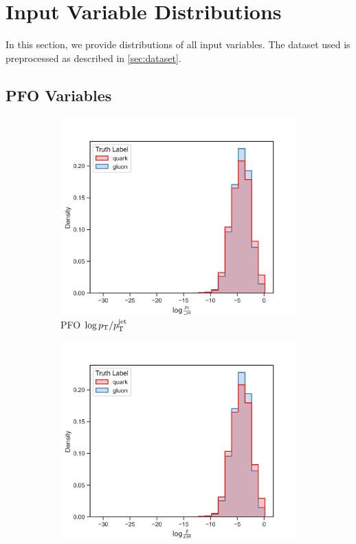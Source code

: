 \chapter{Input Variable Distributions}
\label{ch:app_input_variables}
In this section, we provide distributions of all input variables.
The dataset used is preprocessed as described in \cref{sec:dataset}.

\section{PFO Variables}
\label{sec:app_pfo_variables}
\begin{figure}[!htb]
    \begin{subfigure}[t]{0.45\textwidth}
        \includegraphics[width=\linewidth]{src/plots/distributions/PFOs/log_PT|PTjet.png}
        \caption{PFO $\log p_\text{T} / p_\text{T}^{\mathrm{jet}}$}
        \label{fig:app_pfo_log_pT_over_pT_jet}
    \end{subfigure}
    \begin{subfigure}[t]{0.45\textwidth}
        \includegraphics[width=\linewidth]{src/plots/distributions/PFOs/log_E|Ejet.png}

\end{subfigure}
\end{figure}
